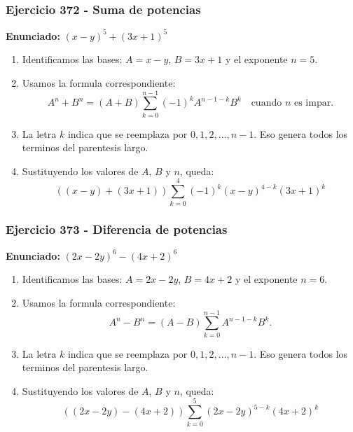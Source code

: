 \documentclass[11pt,a4paper]{article}
\begin{document}
\subsubsection*{Ejercicio 372 - Suma de potencias}
\textbf{Enunciado:} $ \left(x - y\right)^{5}+\left(3 x + 1\right)^{5} $\par
\begin{enumerate}[leftmargin=2em]
\item Identificamos las bases: \(A=x - y\), \(B=3 x + 1\) y el exponente \(n=5\).
\item Usamos la formula correspondiente: \[A^n+B^n=(A+B)\sum_{k=0}^{n-1}(-1)^kA^{n-1-k}B^k\quad\text{cuando }n\text{ es impar}.\]
\item La letra \(k\) indica que se reemplaza por \(0,1,2,\ldots,n-1\). Eso genera todos los terminos del parentesis largo.
\item Sustituyendo los valores de \(A\), \(B\) y \(n\), queda: \[\boxed{\left(\left(x - y\right)+\left(3 x + 1\right)\right)\sum_{k=0}^{4}(-1)^k\left(x - y\right)^{4-k}\left(3 x + 1\right)^k}\]
\end{enumerate}

\vspace{0.2cm}
\subsubsection*{Ejercicio 373 - Diferencia de potencias}
\textbf{Enunciado:} $ \left(2 x - 2 y\right)^{6}-\left(4 x + 2\right)^{6} $\par
\begin{enumerate}[leftmargin=2em]
\item Identificamos las bases: \(A=2 x - 2 y\), \(B=4 x + 2\) y el exponente \(n=6\).
\item Usamos la formula correspondiente: \[A^n-B^n=(A-B)\sum_{k=0}^{n-1}A^{n-1-k}B^k.\]
\item La letra \(k\) indica que se reemplaza por \(0,1,2,\ldots,n-1\). Eso genera todos los terminos del parentesis largo.
\item Sustituyendo los valores de \(A\), \(B\) y \(n\), queda: \[\boxed{\left(\left(2 x - 2 y\right)-\left(4 x + 2\right)\right)\sum_{k=0}^{5}\left(2 x - 2 y\right)^{5-k}\left(4 x + 2\right)^k}\]
\end{enumerate}

\vspace{0.2cm}
\end{document}
